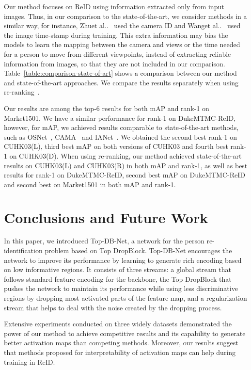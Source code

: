 \documentclass[a4paper,conference]{IEEEtran}
\makeatletter
\DeclareRobustCommand\onedot{\futurelet\@let@token\@onedot}
\def\@onedot{\ifx\@let@token.\else.\null\fi\xspace}
\def\etal{et al\onedot}
\makeatother
\begin{document}
Our method focuses on ReID using information extracted only from input images. Thus, in our comparison to the state-of-the-art, we consider methods in a similar way, for instance, Zhu\etal~\cite{zhu2020aware} used the camera ID and Wang\etal~\cite{wang2019spatial} used the image time-stamp during training. This extra information may bias the models to learn the mapping between the camera and views or the time needed for a person to move from different viewpoints, instead of extracting reliable information from images, so that they are not included in our comparison. Table~\ref{table:comparison-state-of-art} shows a comparison between our method and state-of-the-art approaches. We compare the results separately when using re-ranking~\cite{zhong2017re}.

Our results are among the top-6 results for both mAP and rank-1 on Market1501. We have a similar performance for rank-1 on DukeMTMC-ReID, however, for mAP, we achieved results comparable to state-of-the-art methods, such as OSNet~\cite{zhou2019osnet}, CAMA~\cite{yang2019towards} and IANet~\cite{hou2019interaction}. We obtained the second best rank-1 on CUHK03(L), third best mAP on both versions of CUHK03 and fourth best rank-1 on CUHK03(D). When using re-ranking, our method achieved state-of-the-art results on CUHK03(L) and CUHK03(R) in both mAP and rank-1, as well as best results for rank-1 on DukeMTMC-ReID, second best mAP on DukeMTMC-ReID and second best on Market1501 in both mAP and rank-1.

\section{Conclusions and Future Work}
\label{sec:conclusions}

In this paper, we introduced Top-DB-Net, a network for the person re-identification problem based on Top DropBlock. Top-DB-Net encourages the network to improve its performance by learning to generate rich encoding based on low informative regions. It consists of three streams: a global stream that follows standard feature encoding for the backbone, the Top DropBlock that pushes the network to maintain its performance while using less discriminative regions by dropping most activated parts of the feature map, and a regularization stream that helps to deal with the noise created by the dropping process.

Extensive experiments conducted on three widely datasets demonstrated the power of our method to achieve competitive results and its capability to  generate better activation maps than competing methods. Moreover, our results suggest that methods proposed for interpretability of activation maps can help during training in ReID.
\end{document}
